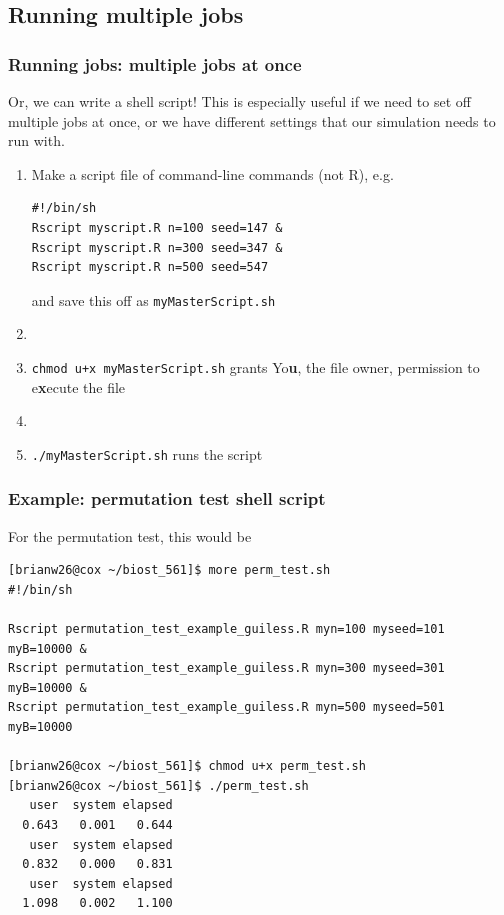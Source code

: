 \documentclass[12pt, 
hyperref={colorlinks=true, linkcolor=blue, urlcolor=cyan}]{beamer}
\begin{document}
\subsection{Running multiple jobs}
\begin{frame}[fragile]
\frametitle{Running jobs: multiple jobs at once}
Or, we can write a shell script! This is especially useful if we need to set off multiple jobs at once, or we have different settings that our simulation needs to run with. 
\begin{enumerate}
\item Make a script file of command-line commands (not R), e.g. 
\begin{verbatim}
#!/bin/sh
Rscript myscript.R n=100 seed=147 &
Rscript myscript.R n=300 seed=347 &
Rscript myscript.R n=500 seed=547
\end{verbatim}
and save this off as \texttt{myMasterScript.sh}
\item[]
\item \texttt{chmod u+x myMasterScript.sh} grants Yo\textbf{u}, the file owner, permission to e\textbf{x}ecute the file
\item[]
\item \texttt{./myMasterScript.sh} runs the script
\end{enumerate}
\end{frame}

\begin{frame}[fragile]
\frametitle{Example: permutation test shell script}
For the permutation test, this would be 
{\scriptsize
\begin{verbatim}
[brianw26@cox ~/biost_561]$ more perm_test.sh
#!/bin/sh

Rscript permutation_test_example_guiless.R myn=100 myseed=101 myB=10000 &
Rscript permutation_test_example_guiless.R myn=300 myseed=301 myB=10000 &
Rscript permutation_test_example_guiless.R myn=500 myseed=501 myB=10000

[brianw26@cox ~/biost_561]$ chmod u+x perm_test.sh
[brianw26@cox ~/biost_561]$ ./perm_test.sh
   user  system elapsed
  0.643   0.001   0.644
   user  system elapsed
  0.832   0.000   0.831
   user  system elapsed
  1.098   0.002   1.100
\end{verbatim}
}
\end{frame}
\end{document}

